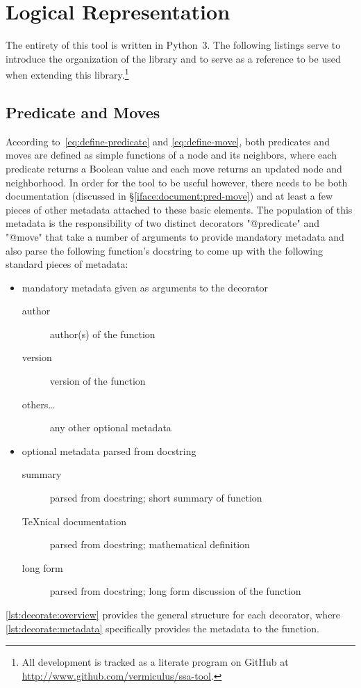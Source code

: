 \section{Logical Representation}
\label{sec:logic-repr}

The entirety of this tool is written in Python~3.
The following listings serve to introduce the organization of the library and
  to serve as a reference to be used when extending this library.\footnote{%
    All development is tracked as a literate program on GitHub
    at \url{http://www.github.com/vermiculus/ssa-tool}.}

\subsection{Predicate and Moves}
\label{sec:logic-repr:predicate-move}

According to~\eqref{eq:define-predicate} and \eqref{eq:define-move},
  both predicates and moves are defined as simple functions of
  a node and its neighbors, where
  each predicate returns a Boolean value and
  each move returns an updated node and neighborhood.
In order for the tool to be useful however,
  there needs to be both documentation (discussed in \S\ref{iface:document:pred-move})
  and at least a few pieces of other metadata attached to these basic elements.
The population of this metadata is the responsibility of two distinct decorators
  \Dash "@predicate" and "@move" \Dash
  that take a number of arguments to provide mandatory metadata
  and also parse the following function's docstring
  to come up with the following standard pieces of metadata:
\begin{itemize}
\item mandatory metadata given as arguments to the decorator
  \begin{description}
  \item[author] author(s) of the function
  \item[version] version of the function
  \item[others\dots] any other optional metadata
  \end{description}
\item optional metadata parsed from docstring
  \begin{description}
  \item[summary] parsed from docstring; short summary of function
  \item[\TeX nical documentation] parsed from docstring; mathematical definition
  \item[long form] parsed from docstring; long form discussion of the function
  \end{description}
\end{itemize}
\autoref{lst:decorate:overview} provides the general structure for each decorator,
  where \autoref{lst:decorate:metadata} specifically provides the metadata to the function.



